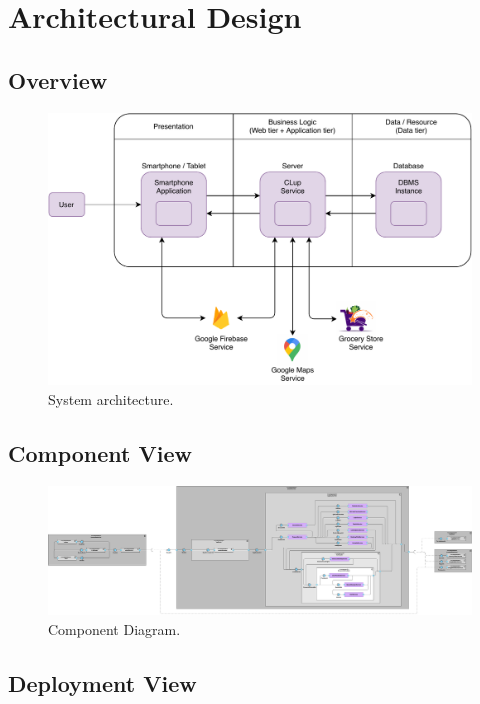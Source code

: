 \chapter{Architectural Design}

\section{Overview}

\begin{figure}[H]
	\centering
	\includegraphics[width=1.0\textwidth]{images/architecture.pdf}
	\caption{System architecture.}
\end{figure}

\section{Component View}

\begin{figure}
	\centering
	\includegraphics[width=1.0\textwidth]{images/component_diagram.pdf}
	\caption{Component Diagram.}
\end{figure}

\section{Deployment View}


